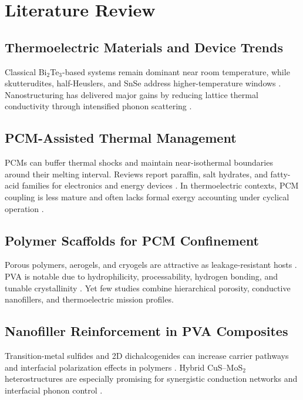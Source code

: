 \chapter{Literature Review}\label{ch:lit}

\section{Thermoelectric Materials and Device Trends}
Classical Bi$_2$Te$_3$-based systems remain dominant near room temperature, while skutterudites, half-Heuslers, and SnSe address higher-temperature windows \citep{rowe1995crc,disalvo1999thermoelectric,pei2012convergence}. Nanostructuring has delivered major gains by reducing lattice thermal conductivity through intensified phonon scattering \citep{venkatasubramanian2001thin,hochbaum2008enhanced,biswas2012high}.

\section{PCM-Assisted Thermal Management}
PCMs can buffer thermal shocks and maintain near-isothermal boundaries around their melting interval. Reviews report paraffin, salt hydrates, and fatty-acid families for electronics and energy devices \citep{khan2017reviewpcm,sharma2009review}. In thermoelectric contexts, PCM coupling is less mature and often lacks formal exergy accounting under cyclical operation \citep{li2019tepcm}.

\section{Polymer Scaffolds for PCM Confinement}
Porous polymers, aerogels, and cryogels are attractive as leakage-resistant hosts \citep{song2018shape}. PVA is notable due to hydrophilicity, processability, hydrogen bonding, and tunable crystallinity \citep{chiellini2003pva}. Yet few studies combine hierarchical porosity, conductive nanofillers, and thermoelectric mission profiles.

\section{Nanofiller Reinforcement in PVA Composites}
Transition-metal sulfides and 2D dichalcogenides can increase carrier pathways and interfacial polarization effects in polymers \citep{wang2018mos2,liang2021cus}. Hybrid CuS--MoS$_2$ heterostructures are especially promising for synergistic conduction networks and interfacial phonon control \citep{zhou2022hetero}.

